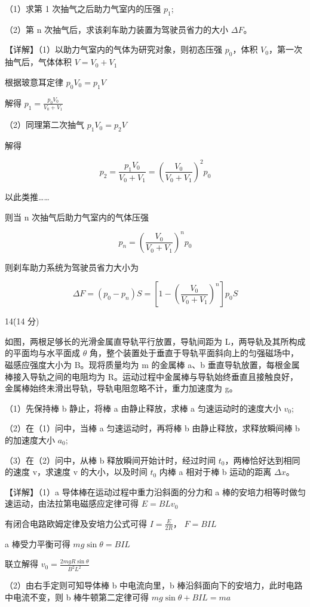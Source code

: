 \documentclass[\gkver]{gaokaozhenti}
\begin{document}
\begin{enumerate}
{（1）求第 1 次抽气之后助力气室内的压强  $p_{1}$;

（2）第 n 次抽气后，求该刹车助力装置为驾驶员省力的大小  $\Delta F$。

【详解】（1）以助力气室内的气体为研究对象，则初态压强  $p_{0}$，体积  $V_{0}$，第一次抽气后，气体体积  $V = V_{0} + V_{1}$

根据玻意耳定律  $p_{0}V_{0}=p_{1}V$

解得  $p_{1}=\frac{p_{0}V_{0}}{V_{0}+V_{1}}$

（2）同理第二次抽气  $p_{1}V_{0}=p_{2}V$

解得

$$ p_{2}=\frac{p_{1}V_{0}}{V_{0}+V_{1}}=\left(\frac{V_{0}}{V_{0}+V_{1}}\right)^{2}p_{0} $$

以此类推……

则当 n 次抽气后助力气室内的气体压强

$$ p_{n}=\left(\frac{V_{0}}{V_{0}+V_{1}}\right)^{n}p_{0} $$

则刹车助力系统为驾驶员省力大小为

$$ \Delta F=(p_{0}-p_{n})S=[1-(\frac{V_{0}}{V_{0}+V_{1}})^{n}]p_{0}S $$

14\. (14 分)

如图，两根足够长的光滑金属直导轨平行放置，导轨间距为 L，两导轨及其所构成的平面均与水平面成  $\theta$ 角，整个装置处于垂直于导轨平面斜向上的匀强磁场中，磁感应强度大小为 B。现将质量均为 m 的金属棒 a、b 垂直导轨放置，每根金属棒接入导轨之间的电阻均为 R。运动过程中金属棒与导轨始终垂直且接触良好，金属棒始终未滑出导轨，导轨电阻忽略不计，重力加速度为 g。

（1）先保持棒 b 静止，将棒 a 由静止释放，求棒 a 匀速运动时的速度大小  $v_{0}$;

（2）在（1）问中，当棒 a 匀速运动时，再将棒 b 由静止释放，求释放瞬间棒 b 的加速度大小  $a_{0}$;

（3）在（2）问中，从棒 b 释放瞬间开始计时，经过时间  $t_{0}$，两棒恰好达到相同的速度 v，求速度 v 的大小，以及时间  $t_{0}$ 内棒 a 相对于棒 b 运动的距离  $\Delta x$。

【详解】（1）a 导体棒在运动过程中重力沿斜面的分力和 a 棒的安培力相等时做匀速运动，由法拉第电磁感应定律可得  $E = B L v_{0}$

有闭合电路欧姆定律及安培力公式可得  $I=\frac{E}{2R}$， $F=BIL$

a 棒受力平衡可得  $mg \sin \theta = BIL$

联立解得  $v_{0}=\frac{2mgR\sin\theta}{B^{2}L^{2}}$

（2）由右手定则可知导体棒 b 中电流向里，b 棒沿斜面向下的安培力，此时电路中电流不变，则 b 棒牛顿第二定律可得  $mg \sin \theta + BIL = ma$

}
\end{enumerate}
\end{document}
